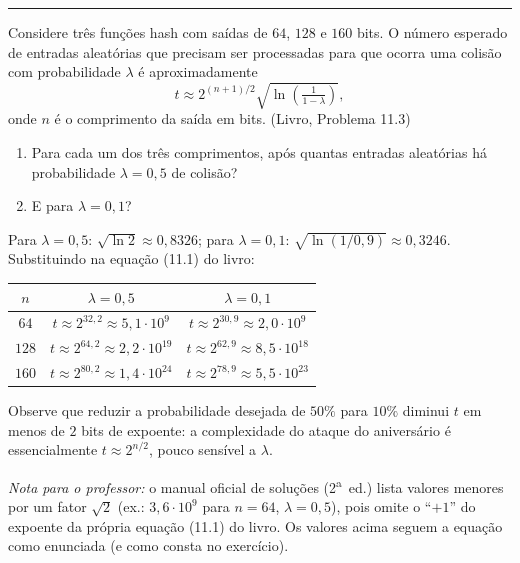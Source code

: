 \documentclass[11pt,a4paper]{article}
\newcommand{\livro}[1]{{\footnotesize\color{black!50}(Livro, Problema #1)}}
\newcommand{\exercicio}[1]{%
    \Needspace{8\baselineskip}%
    \par\vspace{1.2em}
    \noindent
    {\color{black!55}\rule[-0.25em]{3pt}{1.6em}}%
    \hspace{0.6em}{\Large\bfseries Exerc\'{i}cio #1}
    \par\vspace{-0.4em}
    \noindent{\color{black!35}\rule{\textwidth}{0.4pt}}
    \par\vspace{0.35em}
}
\newenvironment{resposta}{%
    \begin{respostabox}
    \color{red!70!black}\sloppy
}{%
    \end{respostabox}
}
\begin{document}
\exercicio{2}
Considere tr\^{e}s fun\c{c}\~{o}es hash com sa\'{i}das de $64$, $128$ e $160$ bits. O n\'{u}mero esperado de entradas aleat\'{o}rias que precisam ser processadas para que ocorra uma colis\~{a}o com probabilidade $\lambda$ \'{e} aproximadamente
\[
    t \approx 2^{(n+1)/2}\sqrt{\ln\!\left(\tfrac{1}{1-\lambda}\right)},
\]
onde $n$ \'{e} o comprimento da sa\'{i}da em bits. \livro{11.3}
\begin{enumerate}[label=(\alph*)]
    \item Para cada um dos tr\^{e}s comprimentos, ap\'{o}s quantas entradas aleat\'{o}rias h\'{a} probabilidade $\lambda = 0{,}5$ de colis\~{a}o?
    \item E para $\lambda = 0{,}1$?
\end{enumerate}

\begin{resposta}
Para $\lambda = 0{,}5$: $\sqrt{\ln 2} \approx 0{,}8326$; para $\lambda = 0{,}1$: $\sqrt{\ln(1/0{,}9)} \approx 0{,}3246$. Substituindo na equa\c{c}\~{a}o (11.1) do livro:

\begin{center}
\begin{tabular}{ccc}
\toprule
$n$ & $\lambda = 0{,}5$ & $\lambda = 0{,}1$\\
\midrule
$64$  & $t \approx 2^{32{,}2} \approx 5{,}1 \cdot 10^{9}$  & $t \approx 2^{30{,}9} \approx 2{,}0 \cdot 10^{9}$\\
$128$ & $t \approx 2^{64{,}2} \approx 2{,}2 \cdot 10^{19}$ & $t \approx 2^{62{,}9} \approx 8{,}5 \cdot 10^{18}$\\
$160$ & $t \approx 2^{80{,}2} \approx 1{,}4 \cdot 10^{24}$ & $t \approx 2^{78{,}9} \approx 5{,}5 \cdot 10^{23}$\\
\bottomrule
\end{tabular}
\end{center}

Observe que reduzir a probabilidade desejada de $50\%$ para $10\%$ diminui $t$ em menos de $2$ bits de expoente: a complexidade do ataque do anivers\'{a}rio \'{e} essencialmente $t \approx 2^{n/2}$, pouco sens\'{i}vel a $\lambda$.

\textit{Nota para o professor:} o manual oficial de solu\c{c}\~{o}es (2\textsuperscript{a}~ed.) lista valores menores por um fator $\sqrt{2}$ (ex.: $3{,}6 \cdot 10^{9}$ para $n=64$, $\lambda=0{,}5$), pois omite o ``$+1$'' do expoente da pr\'{o}pria equa\c{c}\~{a}o (11.1) do livro. Os valores acima seguem a equa\c{c}\~{a}o como enunciada (e como consta no exerc\'{i}cio).
\end{resposta}
\end{document}
